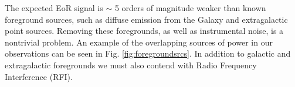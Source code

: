 \documentclass[a0,landscape]{a0poster}
\begin{document}
\begin{multicols}{4}
The expected EoR signal is $\sim$ 5 orders of magnitude weaker than known foreground sources, such as diffuse emission from the Galaxy and extragalactic point sources. Removing these foregrounds, as well as instrumental noise, is a nontrivial problem. An example of the overlapping sources of power in our observations can be seen in Fig. \ref{fig:foregroundsrcs}. In addition to galactic and extragalactic foregrounds we must also contend with Radio Frequency Interference (RFI).






\end{multicols}
\end{document}
